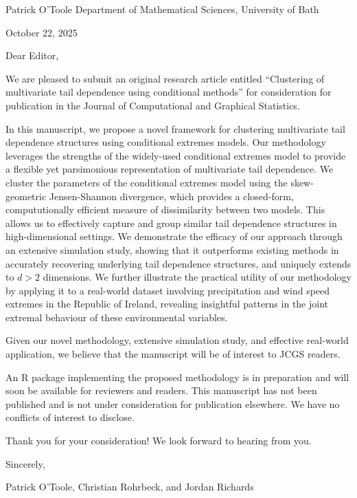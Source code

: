 
Patrick O'Toole
Department of Mathematical Sciences,
University of Bath

October 22, 2025


Dear Editor,

We are pleased to submit an original research article entitled ``Clustering of multivariate tail dependence using conditional methods'' for consideration for publication in the Journal of Computational and Graphical Statistics.

In this manuscript, we propose a novel framework for clustering multivariate tail dependence structures using conditional extremes models. Our methodology leverages the strengths of the widely-used conditional extremes model to provide a flexible yet parsimonious representation of multivariate tail dependence.
We cluster the parameters of the conditional extremes model using the skew-geometric Jensen-Shannon divergence, which provides a closed-form, compututionally efficient measure of dissimilarity between two models. This allows us to effectively capture and group similar tail dependence structures in high-dimensional settings.
We demonstrate the efficacy of our approach through an extensive simulation study, showing that it outperforms existing methods in accurately recovering underlying tail dependence structures, and uniquely extends to $d>2$ dimensions.
We further illustrate the practical utility of our methodology by applying it to a real-world dataset involving precipitation and wind speed extremes in the Republic of Ireland, revealing insightful patterns in the joint extremal behaviour of these environmental variables.

Given our novel methodology, extensive simulation study, and effective real-world application, we believe that the manuscript will be of interest to JCGS readers.

An R package implementing the proposed methodology is in preparation and will soon be available for reviewers and readers. 
This manuscript has not been published and is not under consideration for publication elsewhere. 
We have no conflicts of interest to disclose. 

Thank you for your consideration! We look forward to hearing from you.

Sincerely,

Patrick O'Toole, Christian Rohrbeck, and Jordan Richards


